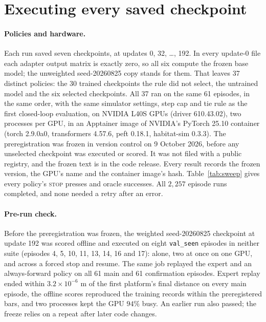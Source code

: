 \section{Executing every saved checkpoint}
\label{app:sweep}

\paragraph{Policies and hardware.}
Each run saved seven checkpoints, at updates 0, 32, \dots, 192. In every update-0 file each adapter
output matrix is exactly zero, so all six compute the frozen base model; the unweighted
seed-20260825 copy stands for them. That leaves 37 distinct policies: the 30 trained checkpoints the
rule did not select, the untrained model and the six selected checkpoints. All 37 ran on the same 61
episodes, in the same order, with the same simulator settings, step cap and tie rule as the first
closed-loop evaluation, on NVIDIA L40S GPUs (driver 610.43.02), two processes per GPU, in an Apptainer image of
NVIDIA's PyTorch 25.10 container (torch 2.9.0a0, transformers 4.57.6, peft 0.18.1, habitat-sim 0.3.3). The
preregistration was frozen in version control on 9 October 2026, before any unselected checkpoint
was executed or scored. It was not filed with a public registry, and the frozen text is in the code
release. Every result records the frozen version, the GPU's name and the container image's hash. Table~\ref{tab:sweep} gives every policy's \textsc{stop} presses and oracle successes. All
$2{,}257$ episode runs completed, and none needed a retry after an error.



\paragraph{Pre-run check.}
Before the preregistration was frozen, the weighted seed-20260825 checkpoint at update 192 was scored offline and
executed on eight \texttt{val\_seen} episodes in neither suite (episodes 4, 5, 10, 11, 13, 14, 16
and 17): alone, two at once on one GPU, and across a forced stop and resume. The same job replayed
the expert and an always-forward policy on all 61 main and 61 confirmation episodes. Expert replay
ended within $3.2\times10^{-6}$ m of the first platform's final distance on every main episode, the offline
scores reproduced the training records within the preregistered bars, and two processes kept the
GPU $94\%$ busy. An earlier run also passed; the freeze relies on a repeat after later code changes.

